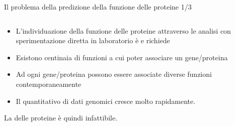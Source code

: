 \documentclass{beamer}
\begin{document}
\begin{tframe}{\small Il problema della predizione della funzione delle proteine 1/3}
  \begin{columns}
    \begin{column}{.75\textwidth}
      \minipage[c][0.4\textheight][s]{\columnwidth}
	   \begin{itemize}	
	  \item L'individuazione della funzione delle proteine attraverso le analisi con sperimentazione diretta in laboratorio è  e richiede 
	  \onslide<2->
	  \item Esistono centinaia di funzioni a cui poter associare un gene/proteina 
	  \onslide<3->
	  \item Ad ogni gene/proteina possono essere associate diverse funzioni contemporaneamente 
	  \item Il quantitativo di dati genomici cresce molto rapidamente.
      \end{itemize}
      La  delle proteine è quindi infattibile.
      \endminipage      
    \end{column}
    \begin{column}{.25\textwidth}



    \end{column}
  \end{columns}

\end{tframe}
\end{document}
